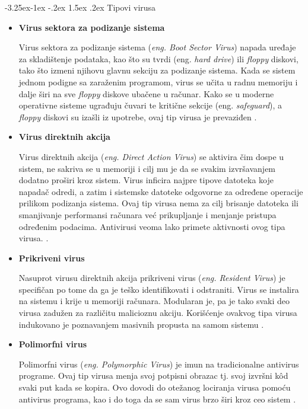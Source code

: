 \documentclass[a4paper]{article}
\makeatletter
\renewcommand\paragraph{\@startsection{paragraph}{4}{\z@}%
   {-3.25ex\@plus -1ex \@minus -.2ex}%
   {1.5ex \@plus .2ex}%
   {\normalfont\normalsize\bfseries}}
\makeatother
\begin{document}
\paragraph{Tipovi virusa}
\begin{itemize}
\item \textbf{Virus sektora za podizanje sistema}

Virus sektora za podizanje sistema (\textit{eng. Boot Sector Virus}) napada uređaje za skladištenje podataka, kao što su tvrdi (eng. \textit{hard drive}) ili \textit{floppy} diskovi, tako što izmeni njihovu glavnu sekciju za podizanje sistema. Kada se sistem jednom podigne sa zaraženim programom, virus se učita u radnu memoriju i dalje širi na sve \textit{floppy} diskove ubačene u računar. Kako se u moderne operativne sisteme ugrađuju čuvari te kritične sekcije (eng. \textit{safeguard}), a \textit{floppy} diskovi su izašli iz upotrebe, ovaj tip virusa je prevaziđen \cite{viruses_and_worms, computer_virus}.


\item \textbf{Virus direktnih akcija}

Virus direktnih akcija (\textit{eng. Direct Action Virus}) se aktivira čim dospe u sistem, ne sakriva se u memoriji i cilj mu je da se svakim izvršavanjem dodatno proširi kroz sistem. Virus inficira najpre tipove datoteka koje napadač odredi, a zatim i sistemske datoteke odgovorne za određene operacije prilikom podizanja sistema. Ovaj tip virusa nema za cilj brisanje datoteka ili smanjivanje performansi računara već prikupljanje i menjanje pristupa određenim podacima. Antivirusi veoma lako primete aktivnosti ovog tipa virusa. \cite{directaction}.


\item \textbf{Prikriveni virus}

Nasuprot virusu direktnih akcija prikriveni virus (\textit{eng. Resident Virus}) je specifičan po tome da ga je teško identifikovati i odstraniti. Virus se instalira na sistemu i krije u memoriji računara. Modularan je, pa je tako svaki deo virusa zadužen za različitu malicioznu akciju. Korišćenje ovakvog tipa virusa indukovano je poznavanjem masivnih propusta na samom sistemu \cite{computer_virus}.

\item \textbf{Polimorfni virus}

Polimorfni virus (\textit{eng. Polymorphic Virus}) je imun na tradicionalne antivirus programe. Ovaj tip virusa menja svoj potpisni obrazac tj. svoj izvršni kôd svaki put kada se kopira. Ovo dovodi do otežanog lociranja virusa pomoću antivirus programa, kao i do toga da se sam virus brzo širi kroz ceo sistem \cite{computer_virus}.


\end{itemize}
\end{document}
